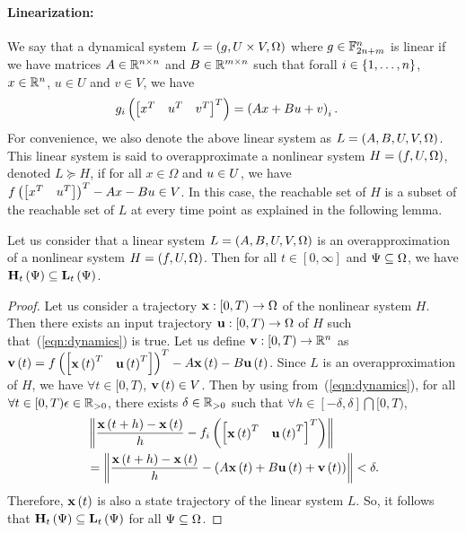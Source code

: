 \paragraph{Linearization:}  We say that a dynamical system
$L = \left(g,U\times V,\Omega\right)$ where $g\in\mathbb{F}_{2n+m}^n$ is
linear if we have matrices $A\in\mathbb{R}^{n\times n}$ and
$B\in\mathbb{R}^{m\times n}$ such that forall $i\in\left\{1,\ldots,n\right\}$,
$x\in\mathbb{R}^n$, $u\in U$ and $v\in V$, we have
%
\begin{align*}
& g_i\left(\begin{bmatrix}x^T & u^T & v^T\end{bmatrix}^T\right) = \left(Ax + Bu + v\right)_i.
\end{align*}
%
For convenience, we also denote the above linear system as $L
= \left(A,B,U,V,\Omega\right)$.  This linear system is said to overapproximate
a nonlinear system $H = \left(f,{U},\Omega\right)$, denoted $L\succeq H$,
if for all $x\in\Omega$ and $u\in{U}$, we have $f\left(\begin{bmatrix}x^T
& u^T\end{bmatrix}\right)^T - Ax - Bu \in V$.  In this case, the reachable set of $H$ is
a subset of the reachable set of $L$ at every time point as explained
in the following lemma.
%
\begin{lemma}\label{lem:inclin}
Let us consider that a linear system $L = \left(A,B,U,V,\Omega\right)$ is an
overapproximation of a nonlinear system $H = \left(f,U,\Omega\right)$.  Then
for all $t\in[0,\infty]$ and $\Psi\subseteq\Omega$, we have
$\mathbf{H}_{t}\left(\Psi\right)\subseteq \mathbf{L}_{t}\left(\Psi\right)$.
\end{lemma}
%
\begin{proof}
Let us consider a trajectory $\mathbf{x}:[0,T)\rightarrow\Omega$ of the
nonlinear system $H$.  Then there exists an input trajectory
$\mathbf{u}:[0,T)\rightarrow\Omega$ of $H$ such
that~(\ref{eqn:dynamics}) is true.  Let us define
$\mathbf{v}:[0,T)\rightarrow \mathbb{R}^n$ as $\mathbf{v}\left(t\right) =
f\left(\begin{bmatrix}\mathbf{x}\left(t\right)^T & \mathbf{u}\left(t\right)^T\end{bmatrix}\right)^T - A\mathbf{x}\left(t\right) -
B\mathbf{u}\left(t\right)$.  Since $L$ is an overapproximation of $H$, we have
$\forall t\in[0,T)$, $\mathbf{v}\left(t\right)\in V$.  Then by using
from~(\ref{eqn:dynamics}), for all $\forall t\in[0,T)\epsilon\in\mathbb{R}_{>0}$, there
exists $\delta\in\mathbb{R}_{>0}$ such that $\forall
h\in[-\delta,\delta]\bigcap [0,T)$,
%
\begin{align*}
& \left\| \frac{ \mathbf{x}\left(t+h\right) - \mathbf{x}\left(t\right) }{h} -
f_i\left( \begin{bmatrix} \mathbf{x}\left(t\right)^T & \mathbf{u}\left(t\right)^T \end{bmatrix}^T \right)\right\|\\
& = \left\| \frac{ \mathbf{x}\left(t+h\right) - \mathbf{x}\left(t\right) }{h} -
\left(A\mathbf{x}\left(t\right) + B\mathbf{u}\left(t\right) + \mathbf{v}\left(t\right)\right) \right\| < \delta.
\end{align*}
%
Therefore, $\mathbf{x}\left(t\right)$ is also a state trajectory of the linear system
$L$.  So, it follows that
$\mathbf{H}_{t}\left(\Psi\right)\subseteq \mathbf{L}_{t}\left(\Psi\right)$ for all
$\Psi\subseteq \Omega$.
\end{proof}
